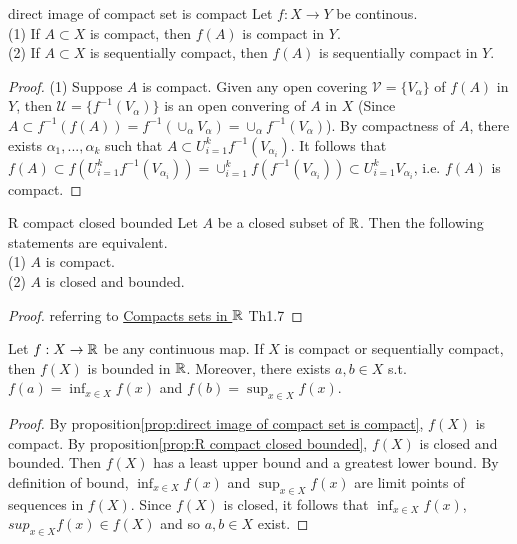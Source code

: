 \begin{proposition}{}{direct image of compact set is compact}
    Let $f:X\rightarrow Y$ be continous. \\
    (1) If $A\subset X$ is compact, then $f(A)$ is compact in $Y$.\\
    (2) If $A\subset X$ is sequentially compact, then $f(A)$ is sequentially compact in $Y$. 
\end{proposition}
\begin{proof}
    (1) Suppose $A$ is compact. Given any open covering $\mathscr{V}=\{V_{\alpha}\}$ of $f(A)$ in $Y$, 
    then $\mathscr{U}=\{f^{-1}(V_{\alpha})\}$ is an open convering of $A$ in $X$ (Since $A\subset f^{-1}(f(A))=f^{-1}(\cup_{\alpha}V_{\alpha})=\cup_{\alpha} f^{-1}(V_{\alpha})$). 
    By compactness of $A$, there exists $\alpha_1,...,\alpha_k$ such that $A\subset U_{i=1}^{k} f^{-1}(V_{\alpha_i})$. 
    It follows that $f(A)\subset f(U_{i=1}^{k} f^{-1}(V_{\alpha_i}))=\cup_{i=1}^{k}f(f^{-1}(V_{\alpha_i}))\subset U_{i=1}^{k}V_{\alpha_i}$, 
    i.e. $f(A)$ is compact. 
\end{proof}

\begin{proposition}{}{R compact closed bounded}
    Let $A$ be a closed subset of $\mathbb{R}$. Then the following statements are equivalent.\\
    (1) $A$ is compact.\\
    (2) $A$ is closed and bounded.
\end{proposition}

\begin{proof}
    referring to \href{https://www.math.cuhk.edu.hk/course_builder/1920/math2060b/compact%20in%20R.pdf}{ Compacts sets in $\mathbb{R}$} Th1.7
\end{proof}


\begin{corollary}{}{}
    Let $f:X\rightarrow \mathbb{R}$ be any continuous map. If $X$ is compact or sequentially compact,
    then $f(X)$ is bounded in $\mathbb{R}$. Moreover, there exists $a,b\in X$ s.t. 
    $f(a)=\inf_{x\in X}f(x)$ and $f(b)=\sup_{x\in X}f(x)$. 
\end{corollary}

\begin{proof}
    By proposition\ref{prop:direct image of compact set is compact}, $f(X)$ is compact. 
    By proposition\ref{prop:R compact closed bounded}, $f(X)$ is closed and bounded. 
    Then $f(X)$ has a least upper bound and a greatest lower bound. By definition of bound, $\inf_{x\in X}f(x)$ and $\sup_{x\in X}f(x)$ 
    are limit points of sequences in $f(X)$. Since $f(X)$ is closed, it follows that $\inf_{x\in X}f(x)$, 
    $sup_{x\in X}f(x)\in f(X)$ and so $a,b\in X$ exist.
\end{proof}


